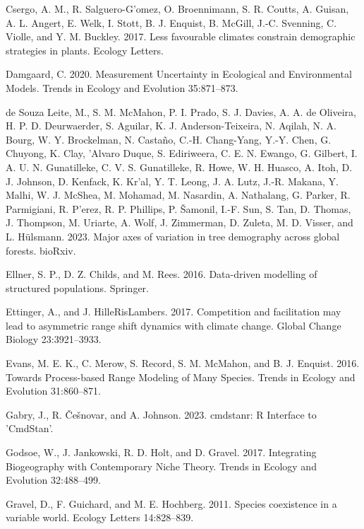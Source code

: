 \documentclass[12pt]{article}
\newlength{\cslhangindent}
\newenvironment{cslreferences}%
  {\setlength{\parindent}{0pt}%
  \everypar{\setlength{\hangindent}{\cslhangindent}}\ignorespaces}%
  {\par}
\begin{document}
\begin{cslreferences}
\leavevmode\hypertarget{ref-Csergo2017}{}%
Csergo, A. M., R. Salguero-G\a'omez, O. Broennimann, S. R. Coutts, A.
Guisan, A. L. Angert, E. Welk, I. Stott, B. J. Enquist, B. McGill, J.-C.
Svenning, C. Violle, and Y. M. Buckley. 2017. Less favourable climates
constrain demographic strategies in plants. Ecology Letters.

\leavevmode\hypertarget{ref-Damgaard2020}{}%
Damgaard, C. 2020. Measurement Uncertainty in Ecological and
Environmental Models. Trends in Ecology and Evolution 35:871--873.

\leavevmode\hypertarget{ref-Leite2023}{}%
de Souza Leite, M., S. M. McMahon, P. I. Prado, S. J. Davies, A. A. de
Oliveira, H. P. D. Deurwaerder, S. Aguilar, K. J. Anderson-Teixeira, N.
Aqilah, N. A. Bourg, W. Y. Brockelman, N. Castaño, C.-H. Chang-Yang,
Y.-Y. Chen, G. Chuyong, K. Clay, \a'Alvaro Duque, S. Ediriweera, C. E.
N. Ewango, G. Gilbert, I. A. U. N. Gunatilleke, C. V. S. Gunatilleke, R.
Howe, W. H. Huasco, A. Itoh, D. J. Johnson, D. Kenfack, K. Kr\a'al, Y.
T. Leong, J. A. Lutz, J.-R. Makana, Y. Malhi, W. J. McShea, M. Mohamad,
M. Nasardin, A. Nathalang, G. Parker, R. Parmigiani, R. P\a'erez, R. P.
Phillips, P. Šamonil, I.-F. Sun, S. Tan, D. Thomas, J. Thompson, M.
Uriarte, A. Wolf, J. Zimmerman, D. Zuleta, M. D. Visser, and L.
Hülsmann. 2023. Major axes of variation in tree demography across global
forests. bioRxiv.

\leavevmode\hypertarget{ref-Ellner2016}{}%
Ellner, S. P., D. Z. Childs, and M. Rees. 2016. Data-driven modelling of
structured populations. Springer.

\leavevmode\hypertarget{ref-Ettinger2017}{}%
Ettinger, A., and J. HilleRisLambers. 2017. Competition and facilitation
may lead to asymmetric range shift dynamics with climate change. Global
Change Biology 23:3921--3933.

\leavevmode\hypertarget{ref-Evans2016}{}%
Evans, M. E. K., C. Merow, S. Record, S. M. McMahon, and B. J. Enquist.
2016. Towards Process-based Range Modeling of Many Species. Trends in
Ecology and Evolution 31:860--871.

\leavevmode\hypertarget{ref-cmdstanr}{}%
Gabry, J., R. Češnovar, and A. Johnson. 2023. cmdstanr: R Interface to
'CmdStan'.

\leavevmode\hypertarget{ref-Godsoe2017}{}%
Godsoe, W., J. Jankowski, R. D. Holt, and D. Gravel. 2017. Integrating
Biogeography with Contemporary Niche Theory. Trends in Ecology and
Evolution 32:488--499.

\leavevmode\hypertarget{ref-Gravel2011}{}%
Gravel, D., F. Guichard, and M. E. Hochberg. 2011. Species coexistence
in a variable world. Ecology Letters 14:828--839.


\end{cslreferences}
\end{document}
